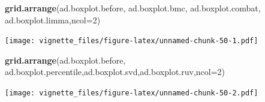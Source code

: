 \documentclass[]{book}
\newenvironment{Shaded}{\begin{snugshade}}{\end{snugshade}}
\newcommand{\KeywordTok}[1]{\textcolor[rgb]{0.13,0.29,0.53}{\textbf{#1}}}
\newcommand{\DataTypeTok}[1]{\textcolor[rgb]{0.13,0.29,0.53}{#1}}
\newcommand{\DecValTok}[1]{\textcolor[rgb]{0.00,0.00,0.81}{#1}}
\newcommand{\StringTok}[1]{\textcolor[rgb]{0.31,0.60,0.02}{#1}}
\newcommand{\OperatorTok}[1]{\textcolor[rgb]{0.81,0.36,0.00}{\textbf{#1}}}
\newcommand{\NormalTok}[1]{#1}
\begin{document}
\begin{Shaded}
\end{Shaded}

\begin{Shaded}
\begin{Highlighting}[]
\KeywordTok{grid.arrange}\NormalTok{(ad.boxplot.before, ad.boxplot.bmc, ad.boxplot.combat, ad.boxplot.limma,}\DataTypeTok{ncol=}\DecValTok{2}\NormalTok{)}
\end{Highlighting}
\end{Shaded}

\texttt{[image: vignette\_files/figure-latex/unnamed-chunk-50-1.pdf]}

\begin{Shaded}
\begin{Highlighting}[]
\KeywordTok{grid.arrange}\NormalTok{(ad.boxplot.before, ad.boxplot.percentile,ad.boxplot.svd,ad.boxplot.ruv,}\DataTypeTok{ncol=}\DecValTok{2}\NormalTok{)}
\end{Highlighting}
\end{Shaded}

\texttt{[image: vignette\_files/figure-latex/unnamed-chunk-50-2.pdf]}
\end{document}
